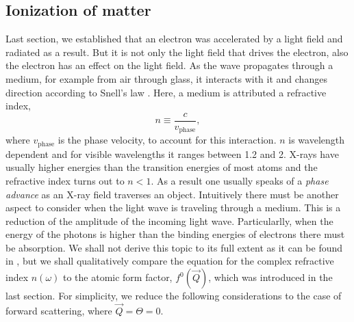 \subsection{Ionization of matter}\label{sec:absorption}
Last section, we established that an electron was accelerated by a light field and radiated as a result.
But it is not only the light field that drives the electron, also the electron has an effect on the light field. As the wave propagates through a medium, for example from air through glass, it interacts with it and changes direction according to Snell's law \citep{Als-Nielson-2011-JWS}. Here, a medium is attributed a refractive index,
\begin{equation}
n\equiv\frac{c}{v_{\text{phase}}},
\label{eq:refractive-index}
\end{equation}
where $v_{\text{phase}}$ is the phase velocity, to account for this interaction. $n$ is wavelength dependent and for visible wavelengths it ranges between 1.2 and 2. X-rays have usually higher energies than the transition energies of most atoms and the refractive index turns out to $n<1$. As a result one usually speaks of a \textit{phase advance} as an X-ray field traverses an object.
Intuitively there must be another aspect to consider when the light wave is traveling through a medium. This is a reduction of the amplitude of the incoming light wave. Particularlly, when the energy of the photons is higher than the binding energies of electrons there must be absorption. We shall not derive this topic to its full extent as it can be found in \citep[][p. 55 ff]{Attwood-2007-CUP}, but we shall qualitatively compare the equation for the complex refractive index $n\left(\omega\right)$ to the atomic form factor, $f^{0}\left(\vec{Q}\right)$, which was introduced in the last section. For simplicity, we reduce the following considerations to the case of forward scattering, where $\vec{Q}=\Theta=0$.\\[1\baselineskip]
